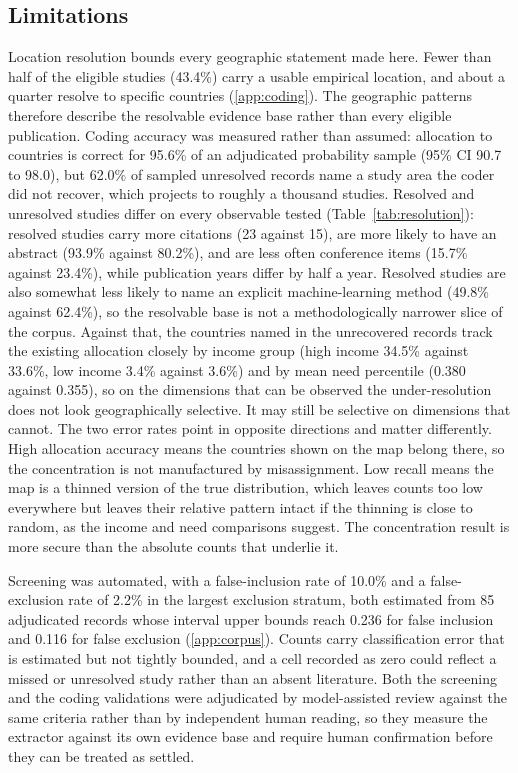 \documentclass[ASNA,twocolumn]{USG}
\begin{document}
\subsection{Limitations}

Location resolution bounds every geographic statement made here. Fewer than half of the
eligible studies (43.4\%) carry a usable empirical location, and about a quarter resolve to
specific countries (\ref{app:coding}). The geographic patterns therefore describe the resolvable
evidence base rather than every eligible publication. Coding accuracy was measured rather than
assumed: allocation to countries is correct for 95.6\% of an adjudicated probability sample (95\% CI 90.7 to
98.0), but 62.0\% of sampled unresolved records name a study area the coder did
not recover, which projects to roughly a thousand studies. Resolved and unresolved studies differ on every observable tested (Table~\ref{tab:resolution}):
resolved studies carry more citations (23 against 15), are more likely to have an abstract
(93.9\% against 80.2\%), and are less often conference items (15.7\% against 23.4\%), while
publication years differ by half a year. Resolved studies are also somewhat less likely to name
an explicit machine-learning method (49.8\% against 62.4\%), so the resolvable base is not a
methodologically narrower slice of the corpus. Against that, the countries named in the unrecovered records track the existing allocation closely
by income group (high income 34.5\% against 33.6\%, low income 3.4\% against 3.6\%) and by mean
need percentile (0.380 against 0.355), so on the dimensions that can be observed the
under-resolution does not look geographically selective. It may still be selective on dimensions
that cannot. The two error rates point in opposite directions and matter differently. High
allocation accuracy means the countries shown on the map belong there, so the concentration is not
manufactured by misassignment. Low recall means the map is a thinned version of the true
distribution, which leaves counts too low everywhere but leaves their relative pattern intact if
the thinning is close to random, as the income and need comparisons suggest. The concentration
result is more secure than the absolute counts that underlie it.

Screening was automated, with a false-inclusion rate of 10.0\% and a false-exclusion rate of
2.2\% in the largest exclusion stratum, both estimated from 85 adjudicated records whose interval upper bounds reach 0.236 for false
inclusion and 0.116 for false exclusion (\ref{app:corpus}). Counts carry
classification error that is estimated but not tightly bounded, and a cell recorded as zero could
reflect a missed or unresolved study rather than an absent literature. Both the screening and the
coding validations were adjudicated by model-assisted review against the same criteria rather
than by independent human reading, so they measure the extractor against its own evidence base
and require human confirmation before they can be treated as settled.
\end{document}
